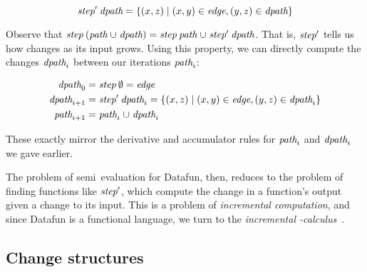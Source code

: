 \[
\text{\itshape step}' \mskip 4mu plus 4mu minus 1mu\text{\itshape dpath} =
\{(x,z) \mathrel{|} (x,y) \in \text{\itshape edge}, (y,z) \in \text{\itshape dpath}\}
\]

\noindent
Observe that $\name{step} \<(\name{path} \cup \name{dpath}) =
\name{step}\<\name{path} \cup \name{step}'\<\name{dpath}$.
%
That is, $\text{\itshape step}'$ tells us how  changes as its input grows.
%
Using this property, we can directly compute the changes $\text{\itshape dpath}_i$
between our iterations $\text{\itshape path}_i$:



\begin{align*}
  \name{dpath}_0
  &= \name{step}\<\emptyset
  = \name{edge}
  \\
  \name{dpath}_{i+1}
  &= \name{step}'\<\name{dpath}_i
  = \setfor{(x,z)}{(x,y) \in \name{edge}, (y,z) \in \name{dpath}_i}
  \\
  \name{path}_{i+1}
  &= \name{path}_i \cup \name{dpath}_i
\end{align*}

\noindent These exactly mirror the derivative and accumulator rules for
\(\text{\itshape path}_i\) and \(\text{\itshape dpath}_i\) we gave earlier.
%

The problem of semi\naive\ evaluation for Datafun, then, reduces to the problem
of finding functions like $\text{\itshape step}'$, which compute the change in a
function's output given a change to its input.
%
This is a problem of \emph{incremental computation}, and since Datafun is a
functional language, we turn to the
\emph{incremental \fn-calculus}~\citep{incremental}.


\subsection{Change structures}
\label{sec:change-structures}

